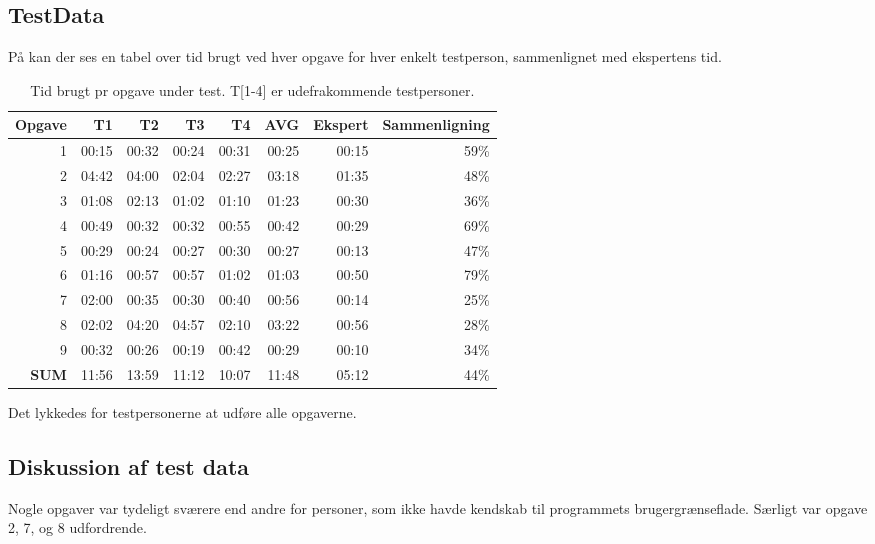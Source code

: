 \subsection{TestData}
På  kan der ses en tabel over tid brugt ved hver opgave for hver enkelt testperson, sammenlignet med ekspertens tid.

\begin{table}[htbp]
  \centering
  \caption{Tid brugt pr opgave under test. T[1-4] er udefrakommende testpersoner.}
    \begin{tabular}{r|rrrr|r|r|r}
    \textbf{Opgave} & T1     & T2     & T3     & T4     & \textbf{AVG} & \textbf{Ekspert} & \textbf{Sammenligning} \\ \hline
    1     & 00:15 & 00:32 & 00:24 & 00:31 & 00:25 & 00:15 & 59\% \\
    2     & 04:42 & 04:00 & 02:04 & 02:27 & 03:18 & 01:35 & 48\% \\
    3     & 01:08 & 02:13 & 01:02 & 01:10 & 01:23 & 00:30 & 36\% \\
    4     & 00:49 & 00:32 & 00:32 & 00:55 & 00:42 & 00:29 & 69\% \\
    5     & 00:29 & 00:24 & 00:27 & 00:30 & 00:27 & 00:13 & 47\% \\
    6     & 01:16 & 00:57 & 00:57 & 01:02 & 01:03 & 00:50 & 79\% \\
    7     & 02:00 & 00:35 & 00:30 & 00:40 & 00:56 & 00:14 & 25\% \\
    8     & 02:02 & 04:20 & 04:57 & 02:10 & 03:22 & 00:56 & 28\% \\
    9     & 00:32 & 00:26 & 00:19 & 00:42 & 00:29 & 00:10 & 34\% \\ \hline
    \textbf{SUM} & 11:56 & 13:59 & 11:12 & 10:07 & 11:48 & 05:12 & 44\% \\
    \end{tabular}%
  \label{tab:TestTimeTable}%
\end{table}%

Det lykkedes for testpersonerne at udføre alle opgaverne.

\subsection{Diskussion af test data}

Nogle opgaver var tydeligt sværere end andre for personer, som ikke havde kendskab til programmets brugergrænseflade. 
Særligt var opgave 2, 7, og 8 udfordrende.


